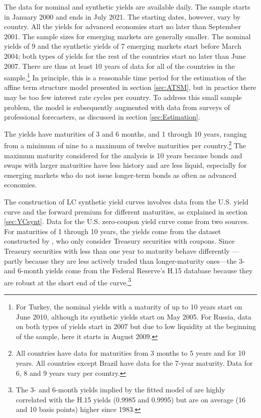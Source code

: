 {The data for nominal and synthetic yields are available daily. 
The sample starts in January 2000 and ends in July 2021. The starting dates, however, vary by country.
All the yields for advanced economies start no later than September 2001.
The sample sizes for emerging markets are generally smaller.
The nominal yields of 9 and the synthetic yields of 7 emerging markets start before March 2004; both types of yields for the rest of the countries start no later than June 2007.
There are thus at least 10 years of data for all of the countries in the sample.\footnote{ For Turkey, the nominal yields with a maturity of up to 10 years start on June 2010, although its synthetic yields start on May 2005. For Russia, data on both types of yields start in 2007 but due to low liquidity at the beginning of the sample, here it starts in August 2009.}
In principle, this is a reasonable time period for the estimation of the affine term structure model presented in section \ref{sec:ATSM}, but in practice there may be too few interest rate cycles per country.
To address this small sample problem, the model is subsequently augmented with data from surveys of professional forecasters, as discussed in section \ref{sec:Estimation}. 

The yields have maturities of 3 and 6 months, and 1 through 10 years, ranging from a minimum of nine to a maximum of twelve maturities per country.\footnote{ All countries have data for maturities from 3 months to 5 years and for 10 years. All countries except Brazil have data for the 7-year maturity. Data for 6, 8 and 9 years vary per country.} 
The maximum maturity considered for the analysis is 10 years because bonds and swaps with larger maturities have less history and are less liquid, especially for emerging markets who do not issue longer-term bonds as often as advanced economies.

The construction of LC synthetic yield curves involves data from the U.S. yield curve and the forward premium for different maturities, as explained in section \ref{sec:YCsynt}. 
Data for the U.S. zero-coupon yield curve come from two sources. 
For maturities of 1 through 10 years, the yields come from the dataset constructed by \cite{GSW:2007}, who only consider Treasury securities with coupons. 
Since Treasury securities with less than one year to maturity behave differently \citep{Duffee:2010}---partly because they are less actively traded than longer-maturity ones---the 3- and 6-month yields come from the Federal Reserve's H.15 database because they are robust at the short end of the curve.\footnote{ The 3- and 6-month yields implied by the fitted model of \cite{GSW:2007} are highly correlated with the H.15 yields (0.9985 and 0.9995) but are on average (16 and 10 basis points) higher since 1983.} 

}
